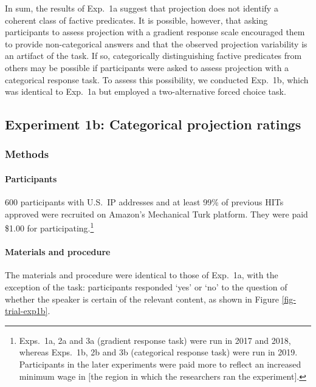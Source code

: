 \documentclass[11pt,fleqn]{article}
\newcommand{\6}{\mbox{$[\hspace*{-.6mm}[$}}
\newcommand{\9}{\mbox{$]\hspace*{-.6mm}]$}}
\begin{document}
In sum, the results of Exp.~1a suggest that projection does not identify a coherent class of factive predicates. It is possible, however, that asking participants to assess projection with a gradient response scale encouraged them to provide non-categorical answers and that the observed projection variability is an artifact of the task. If so, categorically distinguishing factive predicates from others may be possible if participants were asked to assess projection with a categorical response task. To assess this possibility, we conducted Exp.~1b, which was identical to Exp.~1a but employed a two-alternative forced choice task.


\subsection{Experiment 1b: Categorical projection ratings}\label{s-exp1b}

\subsubsection{Methods}

\paragraph{Participants} 600 participants with U.S.\ IP addresses and at least 99\% of previous HITs approved were recruited on Amazon's Mechanical Turk platform. They were paid \$1.00 for participating.\footnote{Exps.~1a, 2a and 3a (gradient response task) were run in 2017 and 2018, whereas  Exps.~1b, 2b and 3b (categorical response task) were run in 2019. Participants in the later experiments were paid more to reflect an increased minimum wage in $[$the region in which the researchers ran the experiment$]$.}


\paragraph{Materials and procedure} The materials and procedure were identical to those of Exp.~1a, with the exception of the task: participants responded `yes' or `no' to the question of whether the speaker is certain of the relevant content, as shown in Figure \ref{fig-trial-exp1b}.
\end{document}
